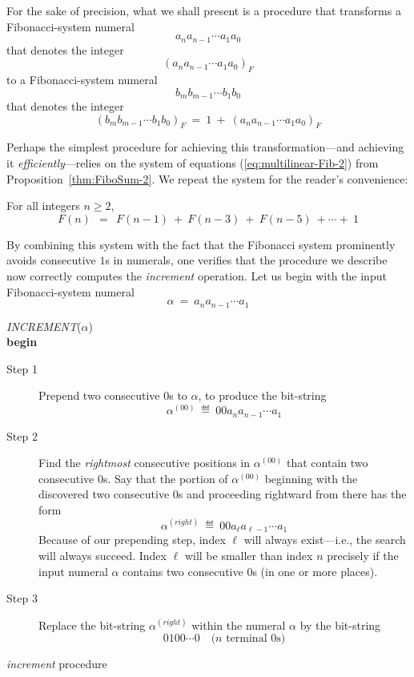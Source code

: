 
\smallskip

\noindent
For the sake of precision, what we shall present is a procedure that transforms a Fibonacci-system numeral
\[ a_n a_{n-1} \cdots a_1 a_0 \]
that denotes the integer
\[ (a_n a_{n-1} \cdots a_1 a_0)_F \]
to a Fibonacci-system numeral
\[ b_m b_{m-1} \cdots b_1 b_0 \]
that denotes the integer
\[ (b_m b_{m-1} \cdots b_1 b_0)_F \ = \ 1 \ + \ (a_n a_{n-1} \cdots a_1 a_0)_F \]

Perhaps the simplest procedure for achieving this transformation---and achieving it {\em efficiently}---relies on the system of equations (\ref{eq:multilinear-Fib-2}) from Proposition~\ref{thm:FiboSum-2}.  We repeat the system for the reader's convenience:

\medskip

\noindent For all integers $n \geq 2$,
\[ F(n) \ \ = \ \ F(n-1) \ + \ F(n-3) \ + \ F(n-5) \ + \cdots + \ 1 \]

\medskip

By combining this system with the fact that the Fibonacci system prominently avoids consecutive $1$s in numerals, one verifies that the procedure we describe now correctly computes the {\em increment} operation.  Let us begin with the input Fibonacci-system numeral
\[ \alpha \ = \  a_n a_{n-1} \cdots a_1 \]

\bigskip

 {\em INCREMENT}($\alpha$) \\
{\bf begin}
\begin{description}
\item[{\sf Step} 1]
Prepend two consecutive $0$s to $\alpha$, to produce the bit-string
\[  \alpha^{(00)} \ \eqdef \  0 0 a_n a_{n-1} \cdots a_1 \]

\item[{\sf Step} 2]
Find the {\em rightmost} consecutive positions in $\alpha^{(00)}$ that contain two consecutive $0$s.  Say that the portion of $\alpha^{(00)}$ beginning with the discovered two consecutive $0$s and proceeding rightward from there has the form
\[  \alpha^{(right)} \ \eqdef \  0 0 a_\ell a_{\ell-1} \cdots a_1 \]
Because of our prepending step, index $\ell$ will always exist---i.e., the search will always succeed.   Index $\ell$ will be smaller than index $n$ precisely if the input numeral $\alpha$ contains two consecutive $0$s (in one or more places).

\item[{\sf Step} 3]
Replace the bit-string $\alpha^{(right)}$ within the numeral $\alpha$ by the bit-string
\[ 0 1 0 0 \cdots 0 \ \ \ \mbox{ ($n$ terminal $0$s)} \]
\end{description}
 {\em increment} procedure

